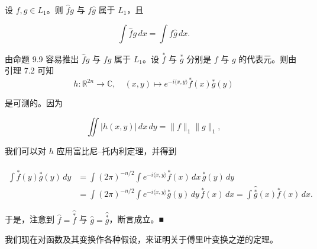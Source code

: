 \begin{proposition}

设 $ f,g \in L_1 $。则 $ \widehat{f}g $ 与 $ f\widehat{g} $ 属于 $ L_1 $，且

\[
\int\widehat{f}g\,dx = \int f\widehat{g}\,dx .
\]

\proofhead
由命题 9.9 容易推出 $ \widehat{f}g $ 与 $ f\widehat{g} $ 属于 $ L_1 $。设 $ \overset{*}{f} $ 与 $ \overset{*}{g} $ 分别是 $ f $ 与 $ g $ 的代表元。则由引理 7.2 可知
\begin{equation}
h\colon \mathbb{R}^{2n} \to \mathbb{C}, \quad (x,y) \mapsto e^{-i\langle x,y\rangle}\overset{*}{f}(x)\overset{*}{g}(y)\tag{9.12}
\end{equation}

是可测的。因为

\begin{equation}
\iint|h(x,y)|\,dx\,dy = \|f\|_1\|g\|_1 ,\tag{9.13}
\end{equation}

我们可以对 $ h $ 应用富比尼–托内利定理，并得到

\begin{equation*}
\begin{aligned}
\int\widehat{\overset{*}{f}}(y)\overset{*}{g}(y)\,dy &= \int(2\pi)^{-n/2}\int e^{-i\langle x,y\rangle}\overset{*}{f}(x)\,dx\,\overset{*}{g}(y)\,dy \\ &= \int(2\pi)^{-n/2}\int e^{-i\langle x,y\rangle}\overset{*}{g}(y)\,dy\,\overset{*}{f}(x)\,dx = \int\widehat{\overset{*}{g}}(x)\overset{*}{f}(x)\,dx .
\end{aligned}
\end{equation*}

于是，注意到 $ \widehat{f} = \widehat{\overset{*}{f}} $ 与 $ \widehat{g} = \widehat{\overset{*}{g}} $，断言成立。\nobreak\hspace{0.35em}■

\end{proposition}

我们现在对函数及其变换作各种假设，来证明关于傅里叶变换之逆的定理。

